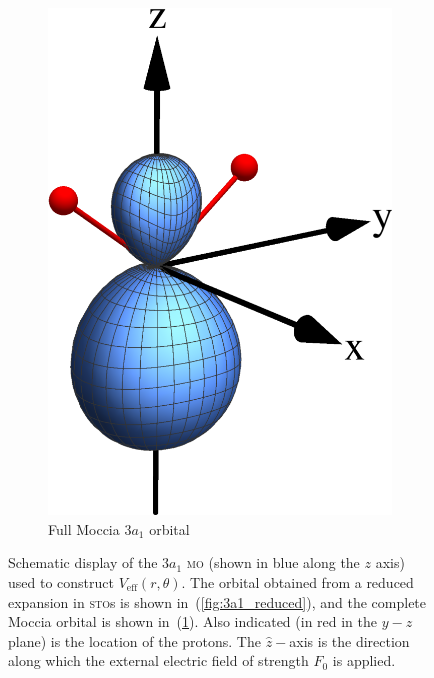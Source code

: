 \begin{figure}
\begin{subfigure}[b]{0.25\linewidth}
    \includegraphics[width=\textwidth]{figures/ch_H2O/3a1/3a1Moccia.eps}
    \caption{Full Moccia $3a_{1}$ orbital}\label{fig:3a1_Moccia}
  \end{subfigure}
  \caption{Schematic display of the $3a_{1}$ \textsc{mo} (shown
    in blue along the $z$ axis) used to construct
    $V_{\mathrm{eff}}(r,\theta)$. The orbital obtained from a reduced
    expansion in \textsc{sto}s is shown in~(\ref{fig:3a1_reduced}),
    and the complete Moccia orbital is shown
    in~(\ref{fig:3a1_Moccia}). Also indicated (in red in the $y-z$
    plane) is the location of the protons. The $\hat{z}-$axis is the
    direction along which the external electric field of strength
    $F_{0}$ is applied.}
  \label{fig:3a1_prob_density}
\end{figure}

